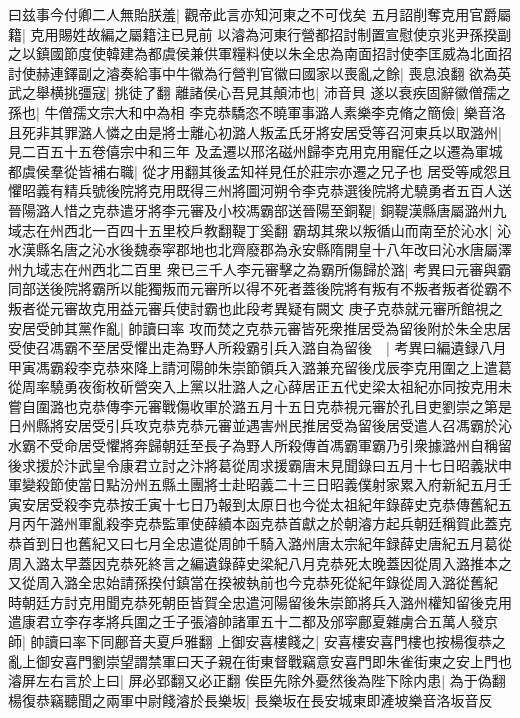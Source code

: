 曰兹事今付卿二人無貽朕羞|{
	觀帝此言亦知河東之不可伐矣}
五月詔削奪克用官爵屬籍|{
	克用賜姓故編之屬籍注已見前}
以濬為河東行營都招討制置宣慰使京兆尹孫揆副之以鎮國節度使韓建為都虞侯兼供軍糧料使以朱全忠為南面招討使李匡威為北面招討使赫連鐸副之濬奏給事中牛徽為行營判官徽曰國家以喪亂之餘|{
	喪息浪翻}
欲為英武之舉横挑彊寇|{
	挑徒了翻}
離諸侯心吾見其顛沛也|{
	沛音貝}
遂以衰疾固辭徽僧孺之孫也|{
	牛僧孺文宗大和中為相}
李克恭驕恣不曉軍事潞人素樂李克脩之簡儉|{
	樂音洛}
且死非其罪潞人憐之由是將士離心初潞人叛孟氏牙將安居受等召河東兵以取潞州|{
	見二百五十五卷僖宗中和三年}
及孟遷以邢洺磁州歸李克用克用寵任之以遷為軍城都虞侯羣從皆補右職|{
	從才用翻其後孟知祥見任於莊宗亦遷之兄子也}
居受等咸怨且懼昭義有精兵號後院將克用既得三州將圖河朔令李克恭選後院將尤驍勇者五百人送晉陽潞人惜之克恭遣牙將李元審及小校馮霸部送晉陽至銅鞮|{
	銅鞮漢縣唐屬潞州九域志在州西北一百四十五里校戶教翻鞮丁奚翻}
霸刼其衆以叛循山而南至於沁水|{
	沁水漢縣名唐之沁水後魏泰寜郡地也北齊廢郡為永安縣隋開皇十八年改曰沁水唐屬澤州九域志在州西北二百里}
衆已三千人李元審擊之為霸所傷歸於潞|{
	考異曰元審與霸同部送後院將霸所以能獨叛而元審所以得不死者蓋後院將有叛有不叛者叛者從霸不叛者從元審故克用益元審兵使討霸也此段考異疑有闕文}
庚子克恭就元審所館視之安居受帥其黨作亂|{
	帥讀曰率}
攻而焚之克恭元審皆死衆推居受為留後附於朱全忠居受使召馮霸不至居受懼出走為野人所殺霸引兵入潞自為留後　|{
	考異曰編遺録八月甲寅馮霸殺李克恭來降上請河陽帥朱崇節領兵入潞兼充留後戊辰李克用圍之上遣葛從周率驍勇夜銜枚斫營突入上黨以壯潞人之心薛居正五代史梁太祖紀亦同按克用未嘗自圍潞也克恭傳李元審戰傷收軍於潞五月十五日克恭視元審於孔目吏劉崇之第是日州縣將安居受引兵攻克恭克恭元審並遇害州民推居受為留後居受遣人召馮霸於沁水霸不受命居受懼將奔歸朝廷至長子為野人所殺傳首馮霸軍霸乃引衆據潞州自稱留後求援於汴武皇令康君立討之汴將葛從周求援霸唐末見聞錄曰五月十七日昭義狀申軍變殺節使當日點汾州五縣土團將士赴昭義二十三日昭義僕射家累入府新紀五月壬寅安居受殺李克恭按壬寅十七日乃報到太原日也今從太祖紀年錄薛史克恭傳舊紀五月丙午潞州軍亂殺李克恭監軍使薛績本函克恭首獻之於朝濬方起兵朝廷稱賀此蓋克恭首到日也舊紀又曰七月全忠遣從周帥千騎入潞州唐太宗紀年録薛史唐紀五月葛從周入潞太早蓋因克恭死終言之編遺錄薛史梁紀八月克恭死太晚蓋因從周入潞推本之又從周入潞全忠始請孫揆付鎮當在揆被執前也今克恭死從紀年錄從周入潞從舊紀}
時朝廷方討克用聞克恭死朝臣皆賀全忠遣河陽留後朱崇節將兵入潞州權知留後克用遣康君立李存孝將兵圍之壬子張濬帥諸軍五十二都及邠寜鄜夏雜虜合五萬人發京師|{
	帥讀曰率下同鄜音夫夏戶雅翻}
上御安喜樓餞之|{
	安喜樓安喜門樓也按楊復恭之亂上御安喜門劉崇望謂禁軍曰天子親在街東督戰竊意安喜門即朱雀街東之安上門也}
濬屏左右言於上曰|{
	屏必郢翻又必正翻}
俟臣先除外憂然後為陛下除内患|{
	為于偽翻}
楊復恭竊聽聞之兩軍中尉餞濬於長樂坂|{
	長樂坂在長安城東即滻坡樂音洛坂音反}
